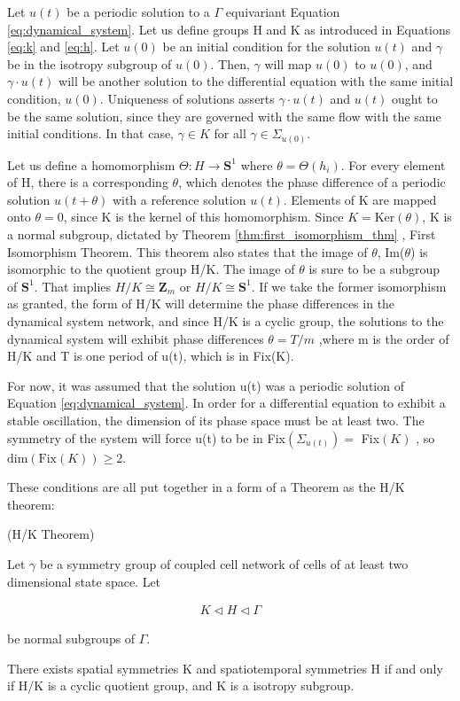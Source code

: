 Let $u(t)$ be a periodic solution to a $\Gamma$ equivariant Equation \ref{eq:dynamical_system}. Let us define groups H and K as introduced in Equations \ref{eq:k} and \ref{eq:h}. Let $u(0)$ be an initial condition for the solution $u(t)$ and $\gamma$ be in the isotropy subgroup of $u(0)$. Then, $\gamma$ will map $u(0)$ to $u(0)$, and $\gamma \cdot u(t)$ will be another solution to the differential equation with the same initial condition, $u(0)$.  Uniqueness of solutions asserts $\gamma \cdot u(t)$ and $u(t)$ ought to be the same solution, since they are governed with the same flow with the same initial conditions. In that case, $\gamma \in K$ for all $\gamma \in \Sigma_{u(0)}$.

Let us define a homomorphism $\Theta : H \rightarrow \mathbf{S}^1$ where $\theta = \Theta(h_i)$. For every element of H, there is a corresponding $\theta$, which denotes the phase difference of a periodic solution $u(t+\theta)$ with a reference solution $u(t)$. Elements of K are mapped onto $\theta = 0$, since K is the kernel of this homomorphism. Since $K=\text{Ker}(\theta)$, K is a normal subgroup, dictated by Theorem \ref{thm:first_isomorphism_thm} , First Isomorphism Theorem. This theorem also states that the image of $\theta$, Im($\theta$) is isomorphic to the quotient group H/K. The image of $\theta$ is sure to be a subgroup of $\mathbf{S}^1$. That implies $H/K \cong \mathbf{Z}_m $ or $H/K \cong \mathbf{S}^1$. If we take the former isomorphism as granted, the form of H/K will determine the phase differences in the dynamical system network, and since H/K is a cyclic group, the solutions to the dynamical system will exhibit phase differences $\theta = T/m$ ,where m is the order of H/K and T is one period of u(t), which is in Fix(K).

For now, it was assumed that the solution u(t) was a periodic solution of Equation \ref{eq:dynamical_system}. In order for a differential equation to exhibit a stable oscillation,
 the dimension of its phase space must be at least two. The symmetry of the system will force u(t) to be in Fix$(\Sigma_{u(t)}) =$ Fix$(K)$ , so $\text{dim}(\text{Fix}(K))\geq 2$. \cite{golubitsky_symmetry_2003}
 
These conditions are all put together in a form of a Theorem as the H/K theorem:  \cite{golubitsky_symmetry_2003}
 
\begin{theorem}(H/K Theorem)
\label{thm:hk}
\cite{golubitsky_symmetry_2003,stewart_symmetry_2003}

Let $\gamma$ be a symmetry group of coupled cell network of cells of at least two dimensional state space. Let 

\begin{align}
 K \triangleleft H \triangleleft \Gamma 
\end{align}
 
%
be normal subgroups of  $\Gamma$. 

There exists spatial symmetries K and spatiotemporal symmetries H if and only if H/K is a cyclic quotient group, and K is a isotropy subgroup.
\end{theorem} 


